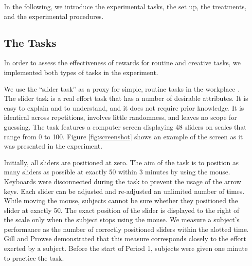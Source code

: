 



In the following, we introduce the 
experimental tasks, the set up, the treatments, and the experimental procedures. 

\subsection{The Tasks}\label{sec:tasks}
In order to assess the effectiveness of rewards for routine and
creative tasks, we implemented both types of tasks in the experiment.

We use the ``slider task'' as a proxy for simple, routine tasks in the workplace \citep{2012_Gill_Prowse}.
The slider task is a real effort task that has a number of desirable attributes. It is easy to explain and 
to understand, and it does not require prior knowledge. 
It is identical across repetitions, involves little randomness, and leaves no scope for guessing. 
The task features a computer screen displaying 48 sliders on scales that range from
0 to 100. Figure \ref{fig:screenshot} shows an example of the screen as it 
was presented in the experiment. 

Initially, all sliders are positioned at zero.
The aim of the task is to position as many sliders as possible at exactly 50 within 3 minutes
by using the mouse. Keyboards were disconnected during the task to prevent 
the usage of the arrow keys. Each slider can be adjusted and re-adjusted an unlimited number of times. 
While moving the mouse, subjects cannot be sure whether they positioned the slider at exactly 50. 
The exact position of the slider is displayed to the right of the scale only  when the subject 
stops using the mouse. We measure a subject's performance as the number of correctly positioned sliders within the alotted time. Gill and Prowse demonstrated that this measure corresponds closely to the effort exerted by a subject. 
Before the start of Period 1, subjects were given one minute to practice the task.


